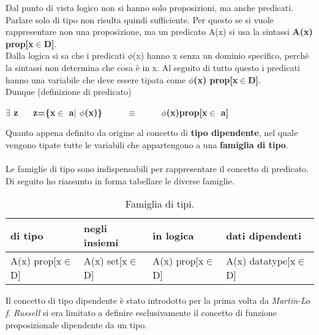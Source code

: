 Dal punto di vista logico non si hanno solo proposizioni, ma anche predicati. Parlare solo di tipo non risulta quindi sufficiente. Per questo se si vuole rappresentare non una proposizione, ma un predicato A(x) si usa la sintassi \textbf{A(x) prop[x$\in$D]}.\\
Dalla logica si sa che i predicati $\phi$(x) hanno x senza un dominio specifico, perch\`e la sintassi non determina che cosa \`e in x. Al seguito di tutto questo i predicati hanno una variabile che deve essere tipata come \textbf{$\phi$(x) prop[x$\in$D]}.\\
Dunque (definizione di predicato)
\begin{center}\textbf{$\exists$ z $\quad$ z=\{x$\in$ a$|$ $\phi$(x)\} $\qquad$ $\equiv$ $\qquad$ $\phi$(x)prop[x$\in$ a]}\end{center}
\noindent
Quanto appena definito da origine al concetto di \textbf{tipo dipendente}, nel quale vengono tipate tutte le variabili che appartengono a una \textbf{famiglia di tipo}.\\\\
Le famiglie di tipo sono indispensabili per rappresentare il concetto di predicato. Di seguito ho riassunto in forma tabellare le diverse famiglie.\\

\begin{table}[h]
\centering
\begin{tabularx}{\textwidth}{XXXp{3.1cm}}
\hline 
\rowcolor{amethyst}
{\color[HTML]{FFFFFF}\textbf{di tipo}} & {\color[HTML]{FFFFFF}\textbf{negli insiemi}} & {\color[HTML]{FFFFFF} \textbf{in logica}} & {\color[HTML]{FFFFFF}\textbf{dati dipendenti}} \\
\hline\hline 
A(x) prop[x$\in$D] & A(x) set[x$\in$D] & A(x) prop[x$\in$D] & A(x) datatype[x$\in$D]  \\  
\hline 
\end{tabularx}
\caption{\label{tab:famiglia-di-tipi}Famiglia di tipi.} 
\end{table}
\noindent
Il concetto di tipo dipendente \`e stato introdotto per la prima volta da \textit{Martin-L$\ddot{o}$f}. \textit{Russell} si era limitato a definire esclusivamente il concetto di funzione proposizionale dipendente da un tipo.
\newpage
